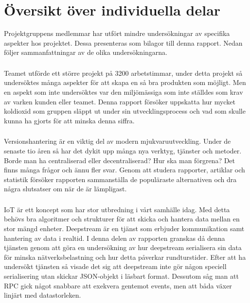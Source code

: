 \chapter{Översikt över individuella delar}
Projektgruppens medlemmar har utfört mindre undersökningar av specifika aspekter hos projektet. Dessa presenteras som bilagor till denna rapport. Nedan följer sammanfattningar av de olika undersökningarna.

\subsection*{}
Teamet utförde ett större projekt på 3200 arbetstimmar, under detta projekt så undersöktes många aspekter för att skapa en så bra produkten som möjligt. Men en aspekt som inte undersöktes var den miljömässiga som inte ställdes som krav av varken kunden eller teamet. Denna rapport försöker uppskatta hur mycket koldioxid som gruppen släppt ut under sin utvecklingsprocess och vad som skulle kunna ha gjorts för att minska denna siffra.

\subsection*{}
Versionshantering är en viktig del av modern mjukvaruutveckling. Under de senaste tio åren så har det dykit upp många nya verktyg, tjänster och metoder. Borde man ha centraliserad eller decentraliserad? Hur ska man förgrena? Det finns många frågor och ännu fler svar. Genom att studera rapporter, artiklar och statistik försöker rapporten sammanställa de populäraste alternativen och dra några slutsatser om när de är lämpligast.

\subsection*{}
IoT är ett koncept som har stor utbredning i vårt samhälle idag. Med detta behövs bra algoritmer och strukturer för att skicka och hantera data mellan en stor mängd enheter. Deepstream är en tjänst som erbjuder kommunikation samt hantering av data i realtid. I denna delen av rapporten granskas då denna tjänsten genom att göra en undersökning av hur deepstream serialisera sin data för minska nätverksbelastning och hur detta påverkar rundturstider. Efter att ha undersökt tjänsten så visade det sig att deepstream inte gör någon speciell serialisering utan skickar JSON-objekt i läsbart format. Dessutom såg man att RPC gick något snabbare att exekvera gentemot events, men att båda växer linjärt med datastorleken.

